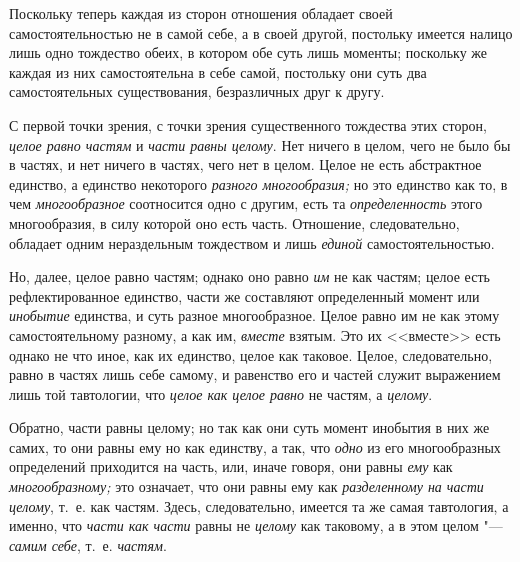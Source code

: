 Поскольку теперь каждая из сторон отношения обладает своей
самостоятельностью не в самой себе, а в своей другой, постольку имеется
налицо лишь одно тождество обеих, в котором обе суть лишь моменты;
поскольку же каждая из них самостоятельна в себе самой, постольку они суть
два самостоятельных существования, безразличных друг к другу.

С первой точки зрения, с точки зрения существенного тождества этих сторон,
{\em целое равно частям} и {\em части равны целому}. Нет ничего в целом, чего
не было бы в частях, и нет ничего в частях, чего нет в целом. Целое не есть
абстрактное единство, а единство некоторого
{\em разного многообразия;} но это единство как то, в чем
{\em многообразное} соотносится одно с другим, есть
та {\em определенность} этого многообразия, в силу
которой оно есть часть. Отношение, следовательно, обладает одним
нераздельным тождеством и лишь {\em единой} самостоятельностью.

Но, далее, целое равно частям; однако оно равно {\em им}
не как частям; целое есть рефлектированное единство, части же составляют
определенный момент или {\em инобытие} единства, и суть
разное многообразное. Целое равно им не как этому самостоятельному разному,
а как им, {\em вместе} взятым. Это их <<вместе>> есть
однако не что иное, как их единство, целое как таковое. Целое,
следовательно, равно в частях лишь себе самому, и равенство его и частей
служит выражением лишь той тавтологии, что {\em целое
как целое равно} не частям, а {\em целому}.

Обратно, части равны целому; но так как они суть момент инобытия в них же
самих, то они равны ему но как единству, а так, что
{\em одно} из его многообразных определений приходится
на часть, или, иначе говоря, они равны {\em ему} как
{\em многообразному;} это означает, что они равны ему
как {\em разделенному на части целому}, т.~е. как
частям. Здесь, следовательно, имеется та же самая тавтология, а именно, что
{\em части как части} равны не {\em целому} как таковому, а в этом целом
"--- {\em самим себе}, т.~е. {\em частям}.

